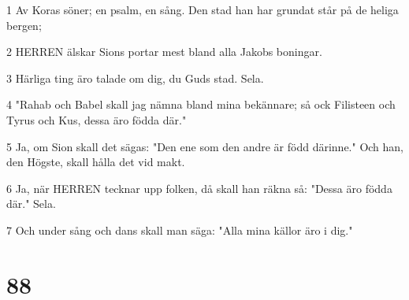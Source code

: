 \par 1 Av Koras söner; en psalm, en sång. Den stad han har grundat står på de heliga bergen;
\par 2 HERREN älskar Sions portar mest bland alla Jakobs boningar.
\par 3 Härliga ting äro talade om dig, du Guds stad. Sela.
\par 4 "Rahab och Babel skall jag nämna bland mina bekännare; så ock Filisteen och Tyrus och Kus, dessa äro födda där."
\par 5 Ja, om Sion skall det sägas: "Den ene som den andre är född därinne." Och han, den Högste, skall hålla det vid makt.
\par 6 Ja, när HERREN tecknar upp folken, då skall han räkna så: "Dessa äro födda där." Sela.
\par 7 Och under sång och dans skall man säga: "Alla mina källor äro i dig."

\chapter{88}

